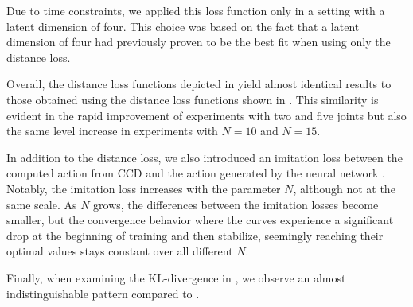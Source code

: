 Due to time constraints, we applied this loss function only in a setting with a latent dimension of four. This choice was based on the fact that a latent dimension of four had previously proven to be the best fit when using only the distance loss.

Overall, the distance loss functions depicted in  yield almost identical results to those obtained using the distance loss functions shown in . This similarity is evident in the rapid improvement of experiments with two and five joints but also the same level increase in experiments with $N=10$ and $N=15$.

In addition to the distance loss, we also introduced an imitation loss between the computed action from CCD and the action generated by the neural network . Notably, the imitation loss increases with the parameter $N$, although not at the same scale. As $N$ grows, the differences between the imitation losses become smaller, but the convergence behavior where the curves experience a significant drop at the beginning of training and then stabilize, seemingly reaching their optimal values stays constant over all different $N$.

Finally, when examining the KL-divergence in , we observe an almost indistinguishable pattern compared to .

